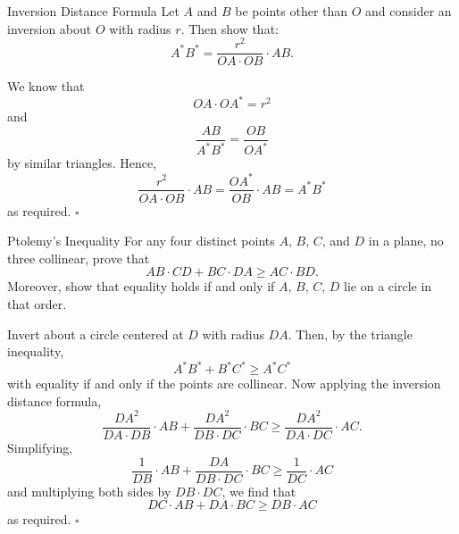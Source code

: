 \documentclass{article}
\begin{document}
\begin{problem}[8.19]{Inversion Distance Formula}
Let $A$ and $B$ be points other than $O$ and consider an inversion about $O$ with radius $r$. Then show that: \[A^*B^* = \dfrac{r^2}{OA \cdot OB} \cdot AB.\]
\end{problem}
We know that \[OA\cdot OA^* = r^2\] and \[\dfrac{AB}{A^*B^*} = \dfrac{OB}{OA^*}\] by similar triangles. Hence, \[\dfrac{r^2}{OA \cdot OB} \cdot AB = \dfrac{OA^*}{OB} \cdot AB = A^*B^*\] as required. $\square$

\begin{problem}[8.20]{Ptolemy's Inequality}
For any four distinct points $A$, $B$, $C$, and $D$ in a plane, no three collinear, prove that \[AB \cdot CD + BC \cdot DA \ge AC \cdot BD.\] Moreover, show that equality holds if and only if $A$, $B$, $C$, $D$ lie on a circle in that order.
\end{problem}
Invert about a circle centered at $D$ with radius $DA$. Then, by the triangle inequality, \[A^*B^*+B^*C^*\ge A^*C^*\] with equality if and only if the points are collinear. Now applying the inversion distance formula, \[\dfrac{DA^2}{DA\cdot DB}\cdot AB + \dfrac{DA^2}{DB\cdot DC}\cdot BC \ge \dfrac{DA^2}{DA\cdot DC}\cdot AC.\] Simplifying, \[\dfrac{1}{DB}\cdot AB + \dfrac{DA}{DB\cdot DC}\cdot BC \ge \dfrac{1}{DC}\cdot AC\] and multiplying both sides by $DB\cdot DC$, we find that \[DC\cdot AB + DA\cdot BC \ge DB\cdot AC\] as required. $\square$
\end{document}

